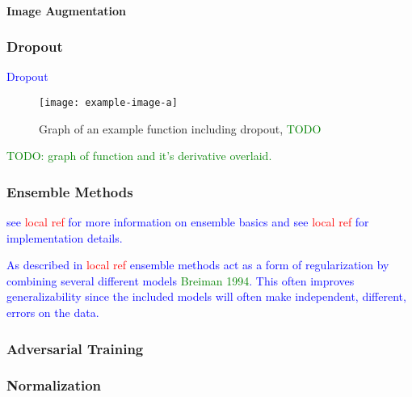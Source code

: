 \paragraph{Image Augmentation}



\subsubsection{Dropout}


\textcolor{blue}{Dropout}


\begin{figure}[htp]
	\centering
	\texttt{[image: example-image-a]}\hfil
	\caption{Graph of an example function including dropout, \textcolor{green}{TODO}}
	\label{fig:regularization_dropout_overview}
\end{figure}
\textcolor{green}{TODO: graph of function and it's derivative overlaid.}


\subsubsection{Ensemble Methods}

\textcolor{blue}{see \textcolor{red}{local ref} for more information on ensemble basics and see \textcolor{red}{local ref} for implementation details.}

\textcolor{blue}{As described in \textcolor{red}{local ref} ensemble methods act as a form of regularization by combining several different models \textcolor{green}{Breiman 1994}. This often improves generalizability since the included models will often make independent, different, errors on the data.}

\subsubsection{Adversarial Training}

\subsubsection{Normalization}


